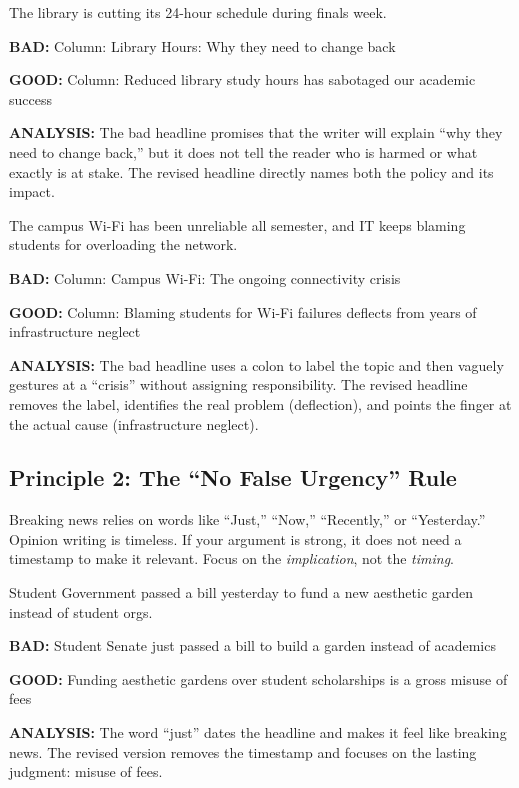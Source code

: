 \documentclass[12pt]{article}
\newcommand{\bad}[1]{\textbf{\textcolor{rose}{BAD:}} #1}
\newcommand{\good}[1]{\textbf{\textcolor{congaree}{GOOD:}} #1}
\newcommand{\context}[1]{#1}
\begin{document}
\begin{exampleblock}
\context{The library is cutting its 24-hour schedule during finals week.}

\bad{Column: Library Hours: Why they need to change back}

\good{Column: Reduced library study hours has sabotaged our academic success}

\textbf{ANALYSIS:} The bad headline promises that the writer will explain ``why they need to change back,'' but it does not tell the reader who is harmed or what exactly is at stake. The revised headline directly names both the policy and its impact.
\end{exampleblock}

\begin{exampleblock}
\context{The campus Wi-Fi has been unreliable all semester, and IT keeps blaming students for overloading the network.}

\bad{Column: Campus Wi-Fi: The ongoing connectivity crisis}

\good{Column: Blaming students for Wi-Fi failures deflects from years of infrastructure neglect}

\textbf{ANALYSIS:} The bad headline uses a colon to label the topic and then vaguely gestures at a ``crisis'' without assigning responsibility. The revised headline removes the label, identifies the real problem (deflection), and points the finger at the actual cause (infrastructure neglect).
\end{exampleblock}

\newpage
\subsection{Principle 2: The ``No False Urgency'' Rule}
Breaking news relies on words like ``Just,'' ``Now,'' ``Recently,'' or ``Yesterday.'' Opinion writing is timeless. If your argument is strong, it does not need a timestamp to make it relevant. Focus on the \textit{implication}, not the \textit{timing}.

\begin{exampleblock}
\context{Student Government passed a bill yesterday to fund a new aesthetic garden instead of student orgs.}

\bad{Student Senate just passed a bill to build a garden instead of academics}

\good{Funding aesthetic gardens over student scholarships is a gross misuse of fees}

\textbf{ANALYSIS:} The word ``just'' dates the headline and makes it feel like breaking news. The revised version removes the timestamp and focuses on the lasting judgment: misuse of fees.
\end{exampleblock}
\end{document}
